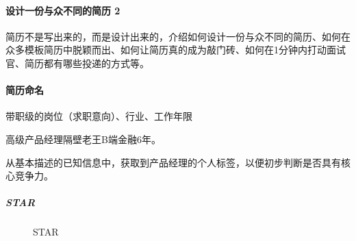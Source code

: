 \documentclass[letterpaper,11pt,english]{sphinxmanual}
\begin{document}
\paragraph{设计一份与众不同的简历 2\sphinxfootnotemark[762]}
\label{\detokenize{chapter_interview/CV:id1}}%
\begin{footnotetext}[762]\sphinxAtStartFootnote
{}
%
\end{footnotetext}\ignorespaces 
简历不是写出来的，而是设计出来的，介绍如何设计一份与众不同的简历、如何在众多模板简历中脱颖而出、如何让简历真的成为敲门砖、如何在1分钟内打动面试官、简历都有哪些投递的方式等。


\paragraph{简历命名}
\label{\detokenize{chapter_interview/CV:id2}}
带职级的岗位（求职意向）、行业、工作年限

高级产品经理\sphinxhyphen{}隔壁老王\sphinxhyphen{}B端金融\sphinxhyphen{}6年。

从基本描述的已知信息中，获取到产品经理的个人标签，以便初步判断是否具有核心竞争力。
%
\begin{footnote}[763]\sphinxAtStartFootnote
{}
%
\end{footnote}


\subparagraph{STAR}
\label{\detokenize{chapter_interview/CV:star}}
\begin{figure}[H]
\centering
\capstart

\noindent{}
\caption{STAR}\label{\detokenize{chapter_interview/CV:id8}}\end{figure}
\end{document}
